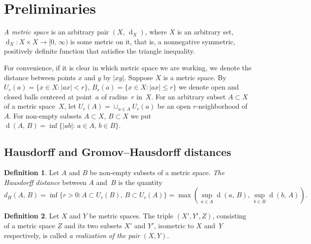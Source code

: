 \documentclass{article}
\theoremstyle{definition}
\newtheorem{definition}{Definition}[]
\theoremstyle{plain}
\newcommand{\dist}{\operatorname{d}}
\renewcommand{\:}{\colon}
\newcommand{\0}{\emptyset}
\renewcommand{\(}{\rom(}
\renewcommand{\)}{\rom)}
\renewcommand{\ss}{\subset}
\begin{document}


\section{Preliminaries}

\emph{A metric space} is an arbitrary pair $(X,\,\dist_X)$, where $X$ is an arbitrary set, $\dist_X\: X\times X\to [0,\,\infty)$ is some metric on it, that is, a nonnegative symmetric, positively definite function that satisfies the triangle inequality.

For convenience, if it is clear in which metric space we are working, we denote the distance between points $x$ and $y$ by $|xy|$. Suppose $X$ is a metric space. By $U_r(a) =\{x\in X\colon |ax|<r\}$, $B_r(a) = \{x\in X\colon |ax|\le r\}$ we denote open and closed balls centered at point~$a$ of radius~$r$ in~$X$. For an arbitrary subset $A\subset X$ of a metric space~$X$, let $U_r(A) = \cup_{a\in A} U_r(a)$ be an open $r$-neighborhood of~$A$. For non-empty subsets $A \ss X$, $B \ss X$ we put $\dist(A,\,B)=\inf\bigl\{|ab|:\,a\in A,\,b\in B\bigl\}$.

\subsection{Hausdorff and Gromov--Hausdorff distances}

\begin{definition}
\label{def: Hausdorff}
Let $A$ and $B$ be non-empty subsets of a metric space.
\emph{The Hausdorff distance} between $A$ and~$B$ is the quantity $$d_H(A,\,B) = \inf\bigl\{r > 0\colon A\subset U_r(B),\,B\subset U_r(A)\bigr\} = \max\left(\sup_{a\in A}\dist(a,\,B),\,\sup_{b\in B}\dist(b,\,A)\right)\!.$$
\end{definition}
\begin{definition} Let $X$ and $Y$ be metric spaces. The triple $(X', Y', Z)$, consisting of a metric space $Z$ and its two subsets $X'$ and $Y'$, isometric to $X$ and~$Y$ respectively, is called \emph{a realization of the pair} $(X, Y)$.
\end{definition}
\end{document}
